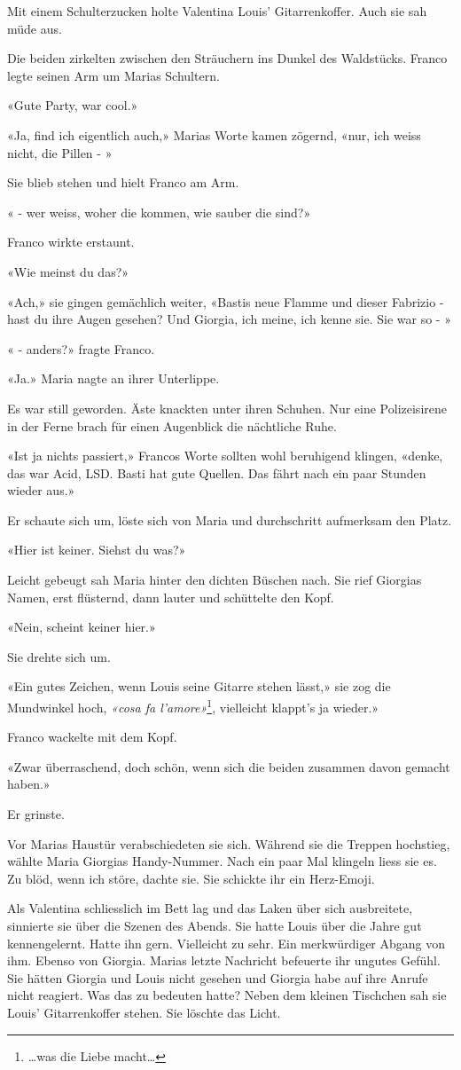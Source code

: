Mit einem Schulterzucken holte Valentina Louis’ Gitarrenkoffer.
Auch sie sah müde aus.

Die beiden zirkelten zwischen den Sträuchern ins Dunkel des Waldstücks.
Franco legte seinen Arm um Marias Schultern.

«Gute Party, war cool.»

«Ja, find ich eigentlich auch,» Marias Worte kamen zögernd, «nur, ich
weiss nicht, die Pillen - »

Sie blieb stehen und hielt Franco am Arm.

« - wer weiss, woher die kommen, wie sauber die sind?»

Franco wirkte erstaunt.

«Wie meinst du das?»

«Ach,» sie gingen gemächlich weiter, «Bastis neue Flamme und dieser
Fabrizio - hast du ihre Augen gesehen? Und Giorgia, ich meine, ich kenne
sie. Sie war so - »

« - anders?» fragte Franco.

«Ja.» Maria nagte an ihrer Unterlippe.

Es war still geworden. Äste knackten unter ihren Schuhen. Nur eine
Polizeisirene in der Ferne brach für einen Augenblick die nächtliche
Ruhe.

«Ist ja nichts passiert,» Francos Worte sollten wohl beruhigend klingen,
«denke, das war Acid, LSD. Basti hat gute Quellen. Das fährt nach ein
paar Stunden wieder aus.»

Er schaute sich um, löste sich von Maria und durchschritt aufmerksam den
Platz.

«Hier ist keiner. Siehst du was?»

Leicht gebeugt sah Maria hinter den dichten Büschen nach. Sie rief Giorgias Namen, erst flüsternd, dann lauter und schüttelte den Kopf.
 
«Nein, scheint keiner hier.»
 
Sie drehte sich um.

«Ein gutes Zeichen, wenn Louis seine Gitarre stehen lässt,» sie zog die Mundwinkel hoch, \emph{«cosa fa l’amore»}\footnote{…was die Liebe macht…}, vielleicht klappt’s ja wieder.»
 
Franco wackelte mit dem Kopf.

«Zwar überraschend, doch schön, wenn sich die beiden zusammen davon gemacht haben.»
 
Er grinste.

Vor Marias Haustür verabschiedeten sie sich. Während sie die Treppen
hochstieg, wählte Maria Giorgias Handy-Nummer. Nach ein paar Mal
klingeln liess sie es. Zu blöd, wenn ich störe, dachte sie. Sie schickte
ihr ein Herz-Emoji.

\sectionbreak

Als Valentina schliesslich im Bett lag und das Laken über sich ausbreitete, sinnierte sie
über die Szenen des Abends. Sie hatte Louis über die Jahre gut kennengelernt. Hatte ihn gern. Vielleicht zu sehr. 
Ein merkwürdiger Abgang von ihm. Ebenso von Giorgia. Marias letzte Nachricht befeuerte ihr ungutes Gefühl. Sie hätten Giorgia 
und Louis nicht gesehen und Giorgia habe auf ihre Anrufe nicht reagiert. Was das zu bedeuten hatte?
Neben dem kleinen Tischchen sah sie Louis’ Gitarrenkoffer stehen.
Sie löschte das Licht.
